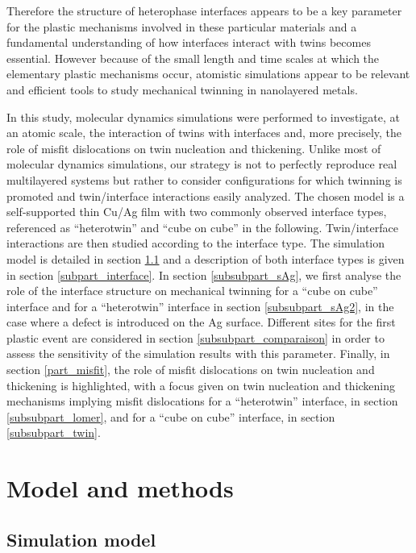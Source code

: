 \documentclass[final,3p,times,twocolumn]{elsarticle}
\begin{document}
Therefore the structure of heterophase interfaces appears to be a key parameter for the plastic mechanisms involved in these particular materials and a fundamental understanding of how interfaces interact with twins becomes essential. However because of the small length and time scales at which the elementary plastic mechanisms occur, atomistic simulations appear to be relevant and efficient tools to study mechanical twinning in nanolayered metals. 

In this study, molecular dynamics simulations were performed to investigate, at an atomic scale, the interaction of twins with interfaces and, more precisely, the role of misfit dislocations on twin nucleation and thickening. Unlike most of molecular dynamics simulations, our strategy is not to perfectly reproduce real multilayered systems but rather to consider configurations for which twinning is promoted and twin/interface interactions easily analyzed. The chosen model is a self-supported thin Cu/Ag film with two commonly observed interface types, referenced as “heterotwin” and “cube on cube” in the following. Twin/interface interactions are then studied according to the interface type. The simulation model is detailed in section \ref{subpart_model} and a description of both interface types is given in section \ref{subpart_interface}. In section \ref{subsubpart_sAg}, we first analyse the role of the interface structure on mechanical twinning for a “cube on cube” interface and for a “heterotwin” interface in section \ref{subsubpart_sAg2}, in the case where a defect is introduced on the Ag surface. Different sites for the first plastic event are considered in section \ref{subsubpart_comparaison} in order to assess the sensitivity of the simulation results with this parameter. Finally, in section \ref{part_misfit}, the role of misfit dislocations on twin nucleation and thickening is highlighted, with a focus given on twin nucleation and thickening mechanisms implying misfit dislocations for a “heterotwin” interface, in section \ref{subsubpart_lomer}, and for a “cube on cube” interface, in section \ref{subsubpart_twin}.         

\section{Model and methods}
\label{part_methods}

	\subsection{Simulation model}
	\label{subpart_model}
\end{document}
